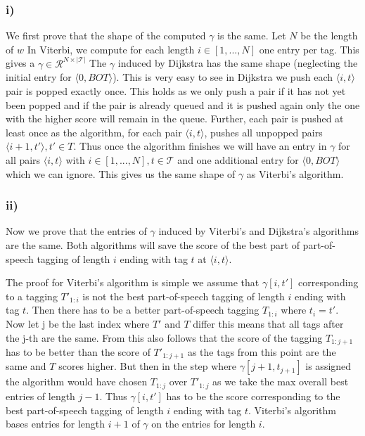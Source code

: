 \documentclass[a4paper,12pt]{ETHexercise}
\begin{document}
\subsubsection*{i)}
We first prove that the shape of the computed $\gamma$ is the same.
Let $N$ be the length of $w$
In Viterbi, we compute for each length $i \in [1,...,N] $ one entry per tag. This gives a $\gamma \in \mathcal{R}^{N \times |\mathcal{T}|}$
The $\gamma$ induced by Dijkstra has the same shape (neglecting the initial entry for $\langle 0, BOT\rangle$).
This is very easy to see in Dijkstra we push each $\langle i, t\rangle$ pair is popped exactly once. This holds as we only push a pair if it has not yet been popped and if the pair is already queued and it is pushed again only the one with the higher score will remain in the queue.
Further, each pair is pushed at least once as the algorithm, for each pair $\langle i, t\rangle$, pushes all unpopped pairs $\langle i+1, t'\rangle, t' \in T$.
Thus once the algorithm finishes we will have an entry in $\gamma$ for all pairs $\langle i, t\rangle$ with $i \in [1,...,N], t \in \mathcal{T}$ and one additional entry for $\langle 0, BOT\rangle$ which we can ignore.
This gives us the same shape of $\gamma$ as Viterbi's algorithm.

\subsubsection*{ii)}
Now we prove that the entries of $\gamma$ induced by Viterbi's and Dijkstra's algorithms are the same.
Both algorithms will save the score of the best part of part-of-speech tagging of length $i$ ending with tag $t$ at $\langle i, t\rangle$.

The proof for Viterbi's algorithm is simple we assume that $\gamma[i,t']$ corresponding to a tagging $T'_{1:i}$ is not the best part-of-speech tagging of length $i$ ending with tag $t$. Then there has to be a better part-of-speech tagging $T_{1:i}$  where $t_i = t'$. Now let j be the last index where $T'$ and $T$ differ this means that all tags after the j-th are the same. From this also follows that the score of the tagging $T_{1:j+1}$ has to be better than the score of $T'_{1:j+1}$ as the tags from this point are the same and $T$ scores higher. But then in the step where $\gamma[j+1, t_{j+1}]$ is assigned the algorithm would have chosen $T_{1:j}$ over $T'_{1:j}$ as we take the max overall best entries of length $j-1$. Thus $\gamma[i,t']$ has to be the score corresponding to the best part-of-speech tagging of length $i$ ending with tag $t$. Viterbi's algorithm bases entries for length $i+1$ of $\gamma$ on the entries for length $i$. 
\end{document}
